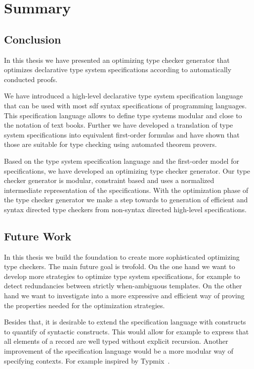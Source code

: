 \chapter{Summary}
\label{cha:summary}
\section{Conclusion}
In this thesis we have presented an optimizing type checker generator
that optimizes declarative type system specifications according to
automatically conducted proofs.

We have introduced a high-level declarative type system specification
language that can be used with most \gls{sdf} syntax specifications of
programming languages. This specification language allows to define
type systems modular and close to the notation of text books. Further
we have developed a translation of type system specifications into
equivalent first-order formulas and have shown that those are suitable
for type checking using automated theorem provers.

Based on the type system specification language and the first-order
model for specifications, we have developed an optimizing type checker
generator. Our type checker generator is modular, constraint based and
uses a normalized intermediate representation of the
specifications. With the optimization phase of the type checker
generator we make a step towards to generation of efficient and syntax
directed type checkers from non-syntax directed high-level
specifications.

\section{Future Work}
In this thesis we build the foundation to create more sophisticated
optimizing type checkers. The main future goal is twofold. On the one
hand we want to develop more strategies to optimize type system
specifications, for example to detect redundancies between strictly
when-ambiguous templates. On the other hand we want to investigate
into a more expressive and efficient way of proving the properties
needed for the optimization strategies.

Besides that, it is desirable to extend the specification language
with constructs to quantify of syntactic constructs. This would allow
for example to express that all elements of a record are well typed
without explicit recursion. Another improvement of the specification
language would be a more modular way of specifying contexts. For
example inspired by Typmix~\cite{bergan2007typmix}.

